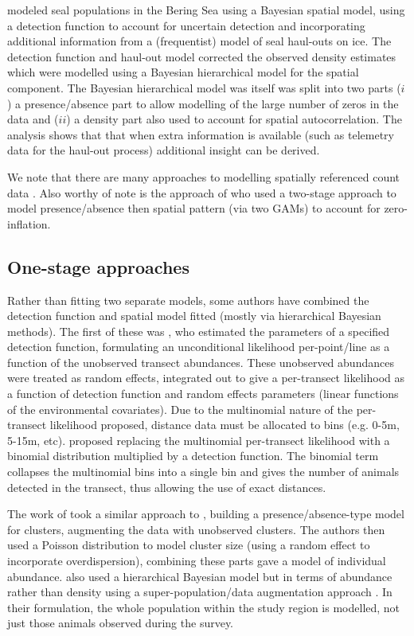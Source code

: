 \documentclass[a4paper,12pt]{article}
\begin{document}
\cite{VerHoef:2013ky} modeled seal populations in the Bering Sea using a Bayesian spatial model, using a detection function to account for uncertain detection and incorporating additional information from a (frequentist) model of seal haul-outs on ice. The detection function and haul-out model corrected the observed density estimates which were modelled using a Bayesian hierarchical model for the spatial component. The Bayesian hierarchical model was itself was split into two parts ($i$) a presence/absence part to allow modelling of the large number of zeros in the data and ($ii$) a density part also used to account for spatial autocorrelation. The analysis shows that that when extra information is available (such as telemetry data for the haul-out process) additional insight can be derived.

We note that there are many approaches to modelling spatially referenced count data \citep[][provides an overview of such methods for marine bird modelling]{Oppel:2011tv}. Also worthy of note is the approach of \cite{Barry:2002bm} who used a two-stage approach to model presence/absence then spatial pattern (via two GAMs) to account for zero-inflation.

\subsection*{One-stage approaches}

Rather than fitting two separate models, some authors have combined the detection function and spatial model fitted (mostly via hierarchical Bayesian methods). The first of these was \cite{Royle:2004tu}, who estimated the parameters of a specified detection function, formulating an unconditional likelihood per-point/line as a function of the unobserved transect abundances. These unobserved abundances were treated as random effects, integrated out to give a per-transect likelihood as a function of detection function and random effects parameters (linear functions of the environmental covariates). Due to the multinomial nature of the per-transect likelihood proposed, distance data must be allocated to bins (e.g. 0-5m, 5-15m, etc). \cite{Chelgren:2011us} proposed replacing the multinomial per-transect likelihood with a binomial distribution multiplied by a detection function. The binomial term collapses the multinomial bins into a single bin and gives the number of animals detected in the transect, thus allowing the use of exact distances.

The work of \cite{Schmidt:2011ec} took a similar approach to \cite{Royle:2008wc}, building a presence/absence-type model for clusters, augmenting the data with unobserved clusters. The authors then used a Poisson distribution to model cluster size (using a random effect to incorporate overdispersion), combining these parts gave a model of individual abundance. \cite{Conn:2012bx} also used a hierarchical Bayesian model but in terms of abundance rather than density using a super-population/data augmentation approach \cite[as in][]{Link:2009wv}. In their formulation, the whole population within the study region is modelled, not just those animals observed during the survey.
\end{document}
